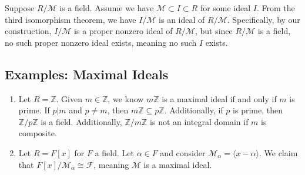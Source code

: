 \documentclass[10pt]{extarticle}
\newcommand{\Z}{\mathbb{Z}}
\begin{document}
  Suppose $R/\mathcal{M}$ is a field. Assume we have $\mathcal{M} \subset I \subset R$ for some ideal $I$. From the third isomorphism theorem, we have $I/\mathcal{M}$ is an ideal of $R/\mathcal{M}$. Specifically, by our construction, $I/\mathcal{M}$ is a proper nonzero ideal of $R/\mathcal{M}$, but since $R/\mathcal{M}$ is a field, no such proper nonzero ideal exists, meaning no such $I$ exists.
  \subsection{Examples: Maximal Ideals}%
  \begin{enumerate}[(1)]
    \item Let $R = \Z$. Given $m\in \Z$, we know $m\Z$ is a maximal ideal if and only if $m$ is prime. If $p|m$ and $p\neq m$, then $m\Z \subseteq p\Z$. Additionally, if $p$ is prime, then $\Z/p\Z$ is a field. Additionally, $\Z/m\Z$ is not an integral domain if $m$ is composite.
    \item Let $R = F[x]$ for $F$ a field. Let $\alpha \in F$ and consider $\mathcal{M}_{\alpha} = \langle x-\alpha\rangle$. We claim that $F[x]/\mathcal{M}_{\alpha} \cong \mathcal{F}$, meaning $\mathcal{M}$ is a maximal ideal.\\


\end{enumerate}
\end{document}
